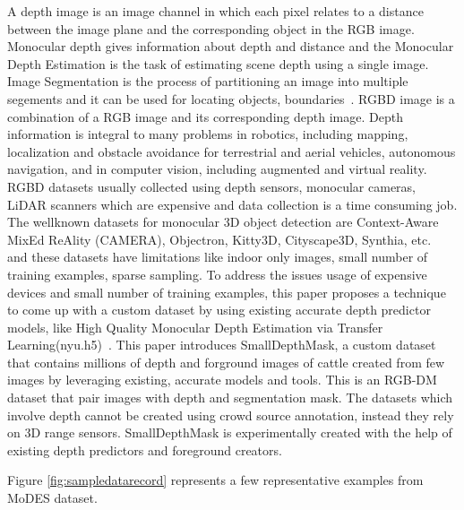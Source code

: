 \documentclass[review]{cvpr}
\begin{document}


A depth image is an image channel in which each pixel relates to a distance between the image plane and the corresponding object in the RGB image.
Monocular depth gives information about depth and distance and the Monocular Depth Estimation is the task of estimating scene depth 
using a single image\cite{abuolaim2020defocus}. 
Image Segmentation is the process of partitioning an image into multiple segements and it can be used for locating objects, boundaries~\cite{amza2012review}. 
RGBD image is a combination of a RGB image and its corresponding depth image\cite{zhang2018deep}.
 Depth information is integral to many problems in
robotics, including mapping, localization and obstacle avoidance for terrestrial and aerial vehicles, autonomous navigation, and in computer vision,
 including augmented and virtual reality\cite{marchand2015pose}. RGBD datasets usually collected using depth sensors, monocular cameras, 
 LiDAR scanners which are expensive and data collection is a time consuming job. The wellknown datasets for monocular 3D object detection are Context-Aware MixEd ReAlity (CAMERA), Objectron, Kitty3D, Cityscape3D, Synthia, etc.~\cite{} and these datasets have limitations like indoor only images, small number of training examples, sparse sampling. To address the issues usage of expensive devices and small number of training examples, this paper proposes a technique to come up with a custom dataset 
 by using existing accurate depth predictor models, like High Quality Monocular Depth Estimation via Transfer Learning(nyu.h5)~\cite{alhashim2018high}. This paper introduces SmallDepthMask, 
 a custom dataset that contains millions of depth and forground images of cattle created from few images by leveraging existing, 
 accurate models and tools. This is an RGB-DM dataset that pair images with depth and segmentation mask. The datasets which involve depth cannot be 
 created using crowd source annotation, instead they rely on 3D range sensors. SmallDepthMask is experimentally created with the help of existing 
 depth predictors and foreground creators.

Figure \ref{fig:sampledatarecord} represents a few representative examples from MoDES dataset.
\end{document}
